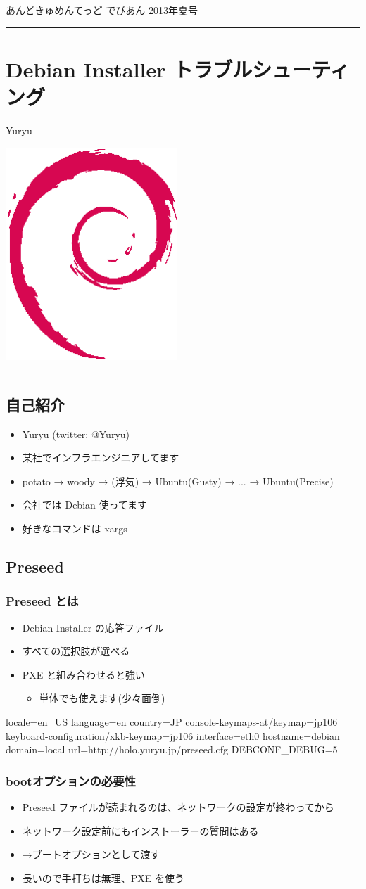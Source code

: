 \documentclass[mingoth,a4paper]{jsarticle}
\renewcommand{\dancersection}[2]{%
\newpage
あんどきゅめんてっど でびあん 2013年夏号
%
\vspace{0.1mm}\\
{\color{dancerdarkblue}\rule{\hsize}{2mm}}

%
%
\begin{minipage}[t]{0.6\hsize}
\color{dancerdarkblue}
\vspace{1cm}
\section{#1}
\hfill{}#2\\
\end{minipage}
\begin{minipage}[t]{0.4\hsize}
\vspace{-2cm}
\hfill{}\includegraphics[height=8cm]{image200502/openlogo-nd.eps}\\
\vspace{-5cm}
\end{minipage}
%
{\color{dancerlightblue}\rule{0.66\hsize}{2mm}}
%
\vspace{2cm}
}
\begin{document}
\dancersection{Debian Installer トラブルシューティング}{Yuryu}

\subsection{自己紹介}
\begin{itemize}
\item Yuryu (twitter: @Yuryu)
\item 某社でインフラエンジニアしてます
\item potato → woody → (浮気) → Ubuntu(Gusty) → ... → Ubuntu(Precise)
\item 会社では Debian 使ってます
\item 好きなコマンドは xargs
\end{itemize}

\subsection{Preseed}
\subsubsection{Preseed とは}
\begin{itemize}
\item Debian Installer の応答ファイル
\item すべての選択肢が選べる
\item PXE と組み合わせると強い
  \begin{itemize}
  \item 単体でも使えます(少々面倒)
  \end{itemize}
\end{itemize}

\begin{commandline}
locale=en_US language=en country=JP
console-keymaps-at/keymap=jp106
keyboard-configuration/xkb-keymap=jp106
interface=eth0 hostname=debian
domain=local url=http://holo.yuryu.jp/preseed.cfg
DEBCONF_DEBUG=5
\end{commandline}

\subsubsection{bootオプションの必要性}
\begin{itemize}
\item Preseed ファイルが読まれるのは、ネットワークの設定が終わってから
\item ネットワーク設定前にもインストーラーの質問はある
\item →ブートオプションとして渡す
\item 長いので手打ちは無理、PXE を使う
\end{itemize}
\end{document}
